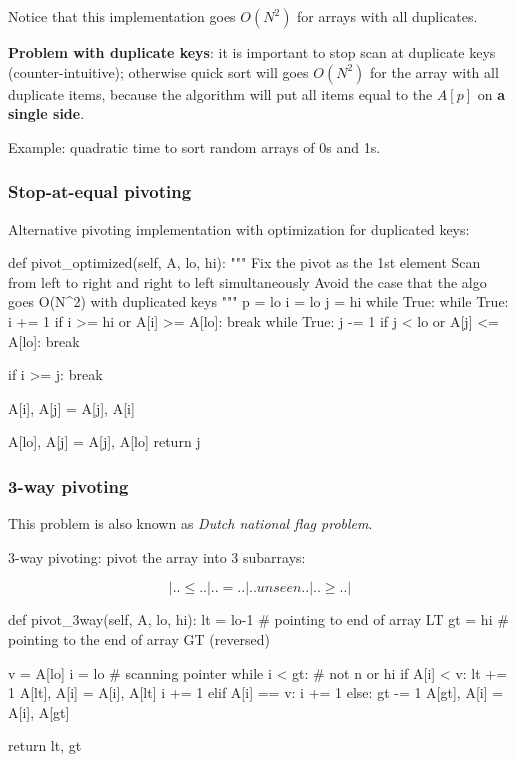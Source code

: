Notice that this implementation goes $O(N^2)$ for arrays with all duplicates.

\textbf{Problem with duplicate keys}: it is important to stop scan at duplicate
keys (counter-intuitive); otherwise quick sort will goes $O(N^2)$ for the
array with all duplicate items, because the algorithm will put all items
equal to the $A[p]$ on \textbf{a single side}. 

Example: quadratic time to sort random arrays of 0s and 1s.

\subsubsection{Stop-at-equal pivoting}
Alternative pivoting implementation with optimization for duplicated keys:
\begin{python}
def pivot_optimized(self, A, lo, hi):
    """
    Fix the pivot as the 1st element
    Scan from left to right and right to left simultaneously
    Avoid the case that the algo goes O(N^2) with duplicated keys
    """
    p = lo
    i = lo
    j = hi
    while True:
        while True:
            i += 1
            if i >= hi or A[i] >= A[lo]:
                break
        while True:
            j -= 1
            if j < lo or A[j] <= A[lo]:
                break

        if i >= j:
            break

        A[i], A[j] = A[j], A[i]

    A[lo], A[j] = A[j], A[lo]
    return j

\end{python}
\subsubsection{3-way pivoting}
This problem is also known as \textit{Dutch national flag problem}.

3-way pivoting: pivot the array into 3 subarrays: 

$$|..\leq..|..=..|..unseen..|..\geq..|$$
\begin{python}
def pivot_3way(self, A, lo, hi):
    lt = lo-1  # pointing to end of array LT
    gt = hi  # pointing to the end of array GT (reversed)

    v = A[lo]
    i = lo  # scanning pointer
    while i < gt:  # not n or hi
        if A[i] < v:
            lt += 1
            A[lt], A[i] = A[i], A[lt]
            i += 1
        elif A[i] == v:
            i += 1
        else:
            gt -= 1
            A[gt], A[i] = A[i], A[gt]

    return lt, gt
\end{python}

